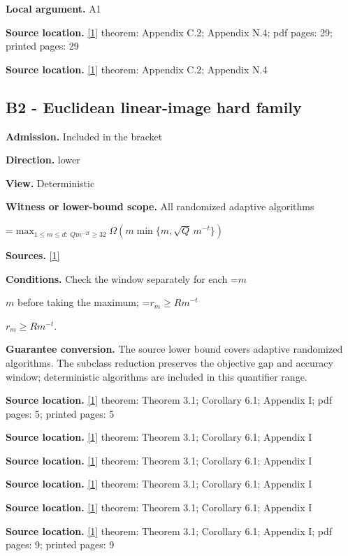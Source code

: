 \documentclass[10pt,a4paper]{article}
\newcommand{\AtlasMath}[1]{\par\begingroup\centering\setbox0=\hbox{$\displaystyle #1$}\ifdim\wd0>1.4\linewidth\typeout{ATLAS WIDE FORMULA: \the\wd0}\fi\ifdim\wd0>\linewidth\resizebox{\linewidth}{!}{\box0}\else\box0\fi\par\endgroup}
\newcommand{\AtlasInlineMath}[1]{\begingroup\setbox0=\hbox{$#1$}\ifdim\wd0>.4\linewidth\endgroup\AtlasMath{#1}\else\endgroup$#1$\fi}
\begin{document}
\textbf{Local argument.} A1

\textbf{Source location.} \href{https://arxiv.org/html/2610.00345v1}{[1]} theorem: Appendix C.2; Appendix N.4; pdf pages: 29; printed pages: 29

\textbf{Source location.} \href{https://arxiv.org/html/2610.00345v1}{[1]} theorem: Appendix C.2; Appendix N.4

\subsection{B2 - Euclidean linear-image hard family}
\textbf{Admission.} Included in the bracket

\textbf{Direction.} lower

\textbf{View.} Deterministic

\textbf{Witness or lower-bound scope.} All randomized adaptive algorithms

\AtlasMath{\max_{1\le m\le d:\ Qm^{-2t}\ge32}\Omega\!\left(m\min\{m,\sqrt Q\,m^{-t}\}\right)}
\textbf{Sources.} \href{https://arxiv.org/html/2610.00345v1}{[1]}

\textbf{Conditions.} Check the window separately for each \AtlasInlineMath{m} before taking the maximum; \AtlasInlineMath{r_m\ge Rm^{-t}}.

\textbf{Guarantee conversion.} The source lower bound covers adaptive randomized algorithms. The subclass reduction preserves the objective gap and accuracy window; deterministic algorithms are included in this quantifier range.

\textbf{Source location.} \href{https://arxiv.org/html/2610.00345v1}{[1]} theorem: Theorem 3.1; Corollary 6.1; Appendix I; pdf pages: 5; printed pages: 5

\textbf{Source location.} \href{https://arxiv.org/html/2610.00345v1}{[1]} theorem: Theorem 3.1; Corollary 6.1; Appendix I

\textbf{Source location.} \href{https://arxiv.org/html/2610.00345v1}{[1]} theorem: Theorem 3.1; Corollary 6.1; Appendix I

\textbf{Source location.} \href{https://arxiv.org/html/2610.00345v1}{[1]} theorem: Theorem 3.1; Corollary 6.1; Appendix I

\textbf{Source location.} \href{https://arxiv.org/html/2610.00345v1}{[1]} theorem: Theorem 3.1; Corollary 6.1; Appendix I

\textbf{Source location.} \href{https://arxiv.org/html/2610.00345v1}{[1]} theorem: Theorem 3.1; Corollary 6.1; Appendix I; pdf pages: 9; printed pages: 9
\end{document}

